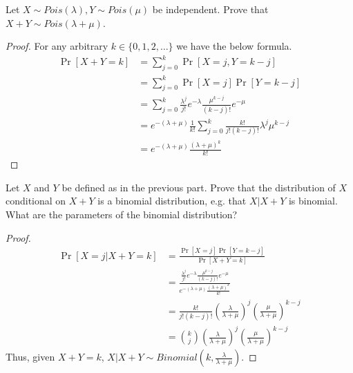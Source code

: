 \documentclass[11pt]{article}
\begin{document}
\begin{Parts}

    \Part Let $X \sim Pois(\lambda), Y \sim Pois(\mu)$ be independent.  Prove that $X + Y \sim Pois(\lambda + \mu)$.

    \begin{Answer}
        \begin{proof}
            For any arbitrary $k \in \{0,1,2,\ldots\}$ we have the below formula. 
            \begin{align*}
                \Pr[X + Y = k] &= \sum_{j=0}^k \Pr[X = j, Y = k - j] \\
                               &= \sum_{j=0}^k \Pr[X = j]\Pr[Y = k - j] \\
                               &= \sum_{j=0}^k \frac{\lambda^j}{j!} e^{-\lambda} \frac{\mu^{k-j}}{(k-j)!}e^{-\mu} \\
                               &= e^{-(\lambda + \mu)}\frac{1}{k!}\sum_{j=0}^k \frac{k!}{j!(k-j)!}\lambda^j\mu^{k-j} \\
                               &= e^{-(\lambda + \mu)}\frac{(\lambda + \mu)^k}{k!}
            \end{align*}
        \end{proof}
    \end{Answer}

    \Part Let $X$ and $Y$ be defined as in the previous part. Prove that the distribution of $X$ conditional on $X+Y$ is a binomial distribution, e.g. that $X|X+Y$ is binomial. What are the parameters of the binomial distribution?

    \begin{Answer}
        \begin{proof}
            \begin{align*}
                \Pr[X=j|X+Y=k] &= \frac{\Pr[X=j]\Pr[Y=k-j]}{\Pr[X+Y=k]} \\
                               &= \frac{\frac{\lambda^j}{j!} e^{-\lambda} \frac{\mu^{k-j}}{(k-j)!}e^{-\mu}}{e^{-(\lambda + \mu)}\frac{(\lambda + \mu)^k}{k!}} \\
                               &= \frac{k!}{j!(k-j)!}(\frac{\lambda}{\lambda + \mu})^j(\frac{\mu}{\lambda + \mu})^{k-j} \\
                               &= {k \choose j}(\frac{\lambda}{\lambda + \mu})^j(\frac{\mu}{\lambda + \mu})^{k-j}
            \end{align*}
            Thus, given $X+Y=k$, $X|X+Y \sim Binomial(k, \frac{\lambda}{\lambda + \mu})$. 
        \end{proof}
    \end{Answer}

\end{Parts}
\end{document}
